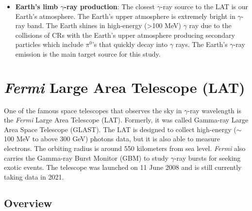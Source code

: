 \begin{itemize}
    

    \item \textbf{Earth's limb $\gamma$-ray production}:
    The closest $\gamma$-ray source to the LAT is our Earth's atmosphere.
    The Earth's upper atmosphere is extremely bright 
    in $\gamma$-ray band. The Earth shines in high-energy
    (>100 MeV) $\gamma$ ray due to the collisions of CRs with
    the Earth's upper atmosphere producing secondary particles
    which include $\pi^0$'s that quickly decay into $\gamma$ rays.
    The Earth's $\gamma$-ray emission is the main target source
    for this study.

\end{itemize}



\section{\textit{Fermi} Large Area Telescope (LAT)}
One of the famous space telescopes that
observes the sky in $\gamma$-ray wavelength is the
\textit{Fermi} Large Area Telescope (LAT).
Formerly, it was called Gamma-ray Large Area Space Telescope (GLAST).
The LAT is designed to collect high-energy ($\sim$100 MeV to above 300 GeV)
photons data, but it is also able to measure electrons.
The orbiting radius is around 550 kilometers
from sea level.
\textit{Fermi} also carries
the Gamma-ray Burst Monitor (GBM) to study $\gamma$-ray
bursts for seeking exotic events. The telescope was launched
on 11 June 2008 and is still currently taking data in 2021.


\subsection{Overview}

